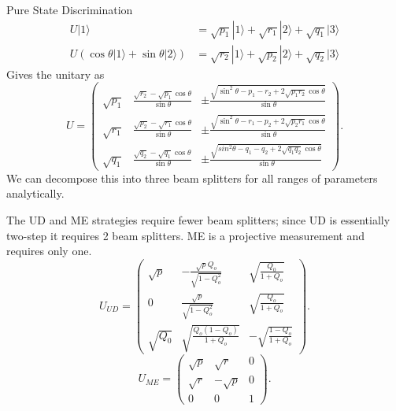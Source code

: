 \documentclass{beamer}
\begin{document}
\begin{frame}{Pure State Discrimination}
\begin{align}
U|1\rangle & =\sqrt{p_{1}}|1\rangle+\sqrt{r_{1}}|2\rangle+\sqrt{q_{1}}|3\rangle\\
U(\cos\theta|1\rangle+\sin\theta|2\rangle) & =\sqrt{r_{2}}|1\rangle+\sqrt{p_{2}}|2\rangle+\sqrt{q_{2}}|3\rangle
\end{align}
Gives the unitary as
\begin{equation}
U=\begin{pmatrix}\sqrt{p_{1}} & \frac{\sqrt{r_{2}}-\sqrt{p_{1}}\cos\theta}{\sin\theta} & \pm\frac{\sqrt{\sin^{2}\theta-p_{1}-r_{2}+2\sqrt{p_{1}r_{2}}\cos\theta}}{\sin\theta}\\
\sqrt{r_{1}} & \frac{\sqrt{p_{2}}-\sqrt{r_{1}}\cos\theta}{\sin\theta} & \pm\frac{\sqrt{\sin^{2}\theta-r_{1}-p_{2}+2\sqrt{p_{2}r_{1}}\cos\theta}}{\sin\theta}\\
\sqrt{q_{1}} & \frac{\sqrt{q_{2}}-\sqrt{q_{1}}\cos\theta}{\sin\theta} & \pm\frac{\sqrt{sin^{2}\theta-q_{1}-q_{2}+2\sqrt{q_{1}q_{2}}\cos\theta}}{\sin\theta}
\end{pmatrix}.
\end{equation}
We can decompose this into three beam splitters for all ranges of parameters analytically.  
\end{frame}
\begin{frame}
The UD and ME strategies require fewer beam splitters; since UD is essentially two-step it requires 2 beam splitters.  ME is a projective measurement and requires only one.
\begin{equation}
U_{UD}=\begin{pmatrix}\sqrt{p} & -\frac{\sqrt{p}Q_{o}}{\sqrt{1-Q_{o}^{2}}} & \sqrt{\frac{Q_{0}}{1+Q_{o}}}\\
0 & \frac{\sqrt{p}}{\sqrt{1-Q_{o}^{2}}} & \sqrt{\frac{Q_{o}}{1+Q_{o}}}\\
\sqrt{Q_{0}} & \sqrt{\frac{Q_{o}(1-Q_{o})}{1+Q_{o}}} & -\sqrt{\frac{1-Q_{o}}{1+Q_{o}}}
\end{pmatrix}.
\end{equation}
\begin{equation}U_{ME}=\begin{pmatrix}\sqrt{p} & \sqrt{r} & 0\\
\sqrt{r} & -\sqrt{p} & 0\\
0 & 0 & 1
\end{pmatrix}.
\end{equation}
\end{frame}
\end{document}
